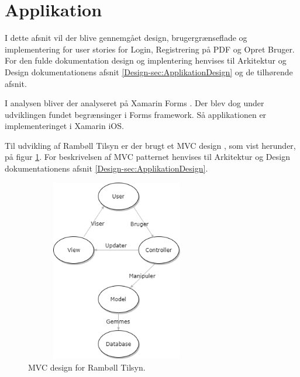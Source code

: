\section{Applikation}
I dette afsnit vil der blive gennemgået design, brugergrænseflade og implementering for user stories for Login, Registrering på PDF og Opret Bruger. For den fulde dokumentation design og implentering henvises til Arkitektur og Design dokumentationens afsnit \ref{Design-sec:ApplikationDesign} og de tilhørende afsnit.

I analysen bliver der analyseret på Xamarin Forms \cite{Forms}. Der blev dog under udviklingen fundet begrænsinger i Forms framework. Så applikationen er implementeringet i Xamarin iOS.

Til udvikling af Rambøll Tilsyn er der brugt et MVC design \cite{MVC}, som vist herunder, på figur \ref{fig:MVC}. For beskrivelsen af MVC patternet henvises til Arkitektur og Design dokumentationens afsnit \ref{Design-sec:ApplikationDesign}.
\begin{figure}[H] %
	\centering
	\includegraphics[height=8cm, width=8cm]{Design/Applikation/MVC}
	\caption{MVC design for Rambøll Tilsyn.}
	\label{fig:MVC}
\end{figure}

\clearpage




